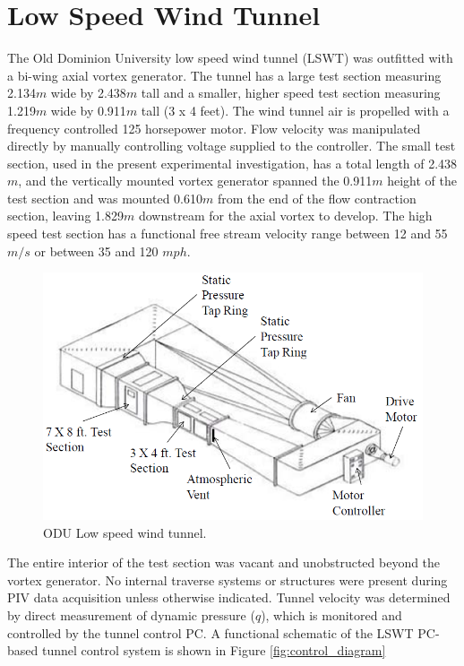 
\section{Low Speed Wind Tunnel}

The Old Dominion University low 
speed wind tunnel (LSWT) was outfitted with a bi-wing axial vortex generator. 
The tunnel has a large test section measuring 2.134$m$ wide by 2.438$m$ 
tall and a smaller, higher speed test section measuring 1.219$m$ wide by 
0.911$m$ tall (3 x 4 feet). The 
wind tunnel air is propelled with a frequency controlled 125 horsepower motor. 
Flow velocity was manipulated directly by manually controlling
voltage supplied to the controller. 
The small test section, used in the present experimental investigation, has a 
total length of 2.438$m$, and the vertically mounted vortex generator 
spanned the 0.911$m$ height of the test section and was 
mounted 0.610$m$ from the end of the flow contraction section, leaving 1.829$m$ 
downstream for the axial 
vortex to develop. The high speed test section has a functional free stream 
velocity range between 12 and 55  $m/s$ or between 35 and 120 $mph$.

\begin{figure}[H]
\centering
\includegraphics[width=5in]{figs/setup/odulswt_diagram}
\caption{ODU Low speed wind tunnel.}
\label{fig:odulswt}
\end{figure}

The entire interior of the test section was vacant and unobstructed beyond the 
vortex generator. 
No internal traverse systems or structures 
were present during PIV data acquisition unless otherwise indicated. Tunnel 
velocity was determined by direct measurement of dynamic pressure ($q$), which 
is monitored and controlled by the tunnel control PC. A functional schematic of 
the LSWT PC-based tunnel control system is shown in Figure 
\ref{fig:control_diagram}

